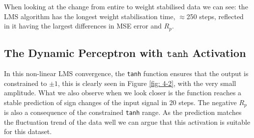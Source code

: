 \documentclass[12pt]{article}
\begin{document}
		When looking at the change from entire to weight stabilised data we can see: the LMS algorithm has the longest weight stabilisation time, $\approx$250 steps, reflected in it having the largest differences in MSE error and $R_p$.
	\subsection{The Dynamic Perceptron with $\texttt{tanh}$ Activation} \label{sec: 4-2-dynamic-perc}
		\begin{minipage}[b]{0.49\textwidth}
			In this non-linear LMS convergence, the \texttt{tanh} function ensures that the output is constrained to $\pm1$, this is clearly seen in Figure \ref{fig: 4-2}, with the very small amplitude. What we also observe when we look closer is the function reaches a stable prediction of sign changes of the input signal in 20 steps. The negative $R_p$ is also a consequence of the constrained \texttt{tanh} range. As the prediction matches the fluctuation trend of the data well we can argue that this activation is suitable for this dataset.
		\end{minipage}%
		\begin{minipage}{0.04\textwidth}
			\hspace*{0.04\textwidth}
		\end{minipage}%
\end{document}
